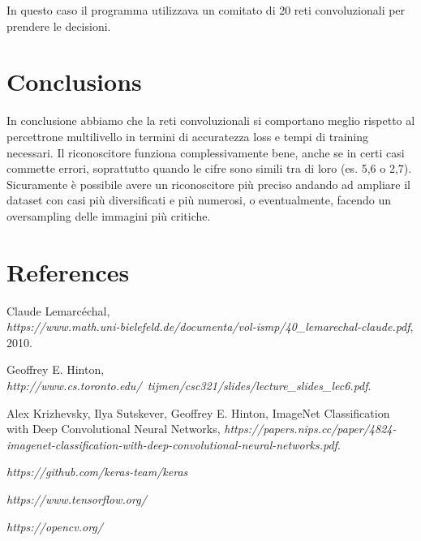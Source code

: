\documentclass[12pt]{article}
\begin{document}
In questo caso il programma utilizzava un comitato di 20 reti convoluzionali
per prendere le decisioni.

\section{Conclusions}

In conclusione abbiamo che la reti convoluzionali si comportano meglio 
rispetto al percettrone multilivello in termini di accuratezza loss e
tempi di training necessari.
Il riconoscitore funziona complessivamente bene, anche se in certi casi
commette errori, soprattutto quando le cifre sono simili tra di loro (es. 5,6 o 2,7).
Sicuramente è possibile avere un riconoscitore più preciso andando
ad ampliare il dataset con casi più diversificati e più numerosi, 
o eventualmente, facendo un oversampling delle immagini più critiche. 

\section{References}

\begin{thebibliography}{9}

  Claude Lemarcéchal,\\
  \textit{https://www.math.uni-bielefeld.de/documenta/vol-ismp/40\_lemarechal-claude.pdf},
  2010.

   Geoffrey E. Hinton,\\
  \textit{http://www.cs.toronto.edu/~tijmen/csc321/slides/lecture\_slides\_lec6.pdf}.

   Alex Krizhevsky, Ilya Sutskever, Geoffrey E. Hinton, 
   ImageNet Classification with Deep Convolutional Neural Networks,
  \textit{https://papers.nips.cc/paper/4824-imagenet-classification-with-deep-convolutional-neural-networks.pdf}.

   \textit{https://github.com/keras-team/keras}

   \textit{https://www.tensorflow.org/}

   \textit{https://opencv.org/}

\end{thebibliography}
\end{document}
